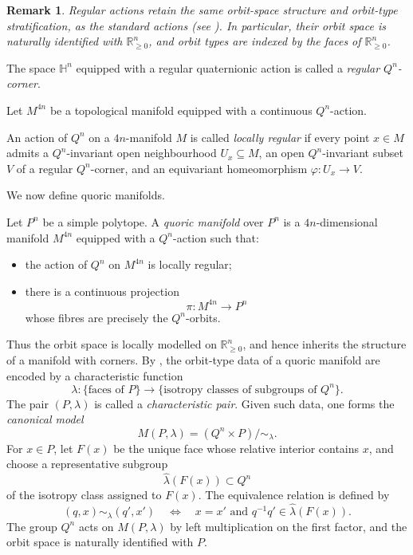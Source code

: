 \documentclass[11pt,a4paper]{article}
\numberwithin{equation}{section}
\newtheorem{remark}[definition]{Remark}
\theoremstyle{named}
\begin{document}
\begin{remark}
Regular actions retain the same orbit-space structure and orbit-type stratification, as the standard actions (see \cite[Proposition 3.1.23]{ho}). In particular, their orbit space is naturally identified with \(\mathbb R_{\ge0}^n\), and orbit types are indexed by the faces of \(\mathbb R_{\ge0}^n\).
\end{remark}

\begin{definition}\label{def:regular_corner}
The space \(\mathbb H^n\) equipped with a regular quaternionic action is called a \emph{regular \(Q^n\)-corner}.
\end{definition}


Let $M^{4n}$ be a topological manifold equipped with a continuous $Q^n$-action.

\begin{definition}\label{def:loc_reg}
An action of \(Q^{n}\) on a  \(4n\)-manifold \(M\) is called \emph{locally regular} if every point \(x\in M\) admits a \(Q^{n}\)-invariant open neighbourhood \(U_x\subseteq M\), an open \(Q^{n}\)-invariant subset \(V\) of a regular \(Q^n\)-corner, and an equivariant homeomorphism $\varphi:U_x\longrightarrow V$.
\end{definition}

We now define quoric manifolds.

\medskip
\begin{definition}\label{def:quoric}
Let $P^n$ be a simple polytope. A \emph{quoric manifold} over $P^n$ is a $4n$-dimensional manifold $M^{4n}$ equipped with a $Q^n$-action such that:
\begin{itemize}
    \item[(1)] the action of $Q^n$ on $M^{4n}$ is locally regular;
    \item[(2)] there is a continuous projection
    \[
    \pi:M^{4n}\to P^n
    \]
    whose fibres are precisely the $Q^n$-orbits.
\end{itemize}
\end{definition}

Thus the orbit space is locally modelled on \(\mathbb R_{\ge0}^n\), and hence inherits the structure of a manifold with corners. By \cite[Definition~4.2.3]{ho}, the orbit-type data of a quoric manifold are encoded by a characteristic function
\[
    \lambda:
    \{\text{faces of }P\}
    \longrightarrow
    \{\text{isotropy classes of subgroups of }Q^n\}.
\]
The pair \((P,\lambda)\) is called a \emph{characteristic pair}. Given such data, one forms the \emph{canonical model}
\[
    M(P,\lambda)
    =
    (Q^n\times P)/{\sim_\lambda}.
\]
For \(x\in P\), let \(F(x)\) be the unique face whose relative interior contains \(x\), and choose a representative subgroup
\[
    \widehat{\lambda}(F(x))\subset Q^n
\]
of the isotropy class assigned to \(F(x)\).  The equivalence relation is
defined by
\[ (q,x)\sim_\lambda(q',x') \quad\Longleftrightarrow\quad x=x'
    \text{ and }
    q^{-1}q'\in \widehat{\lambda}(F(x)).
\]
The group \(Q^n\) acts on \(M(P,\lambda)\) by left multiplication on the first factor, and the orbit space is naturally identified with \(P\).
\end{document}
